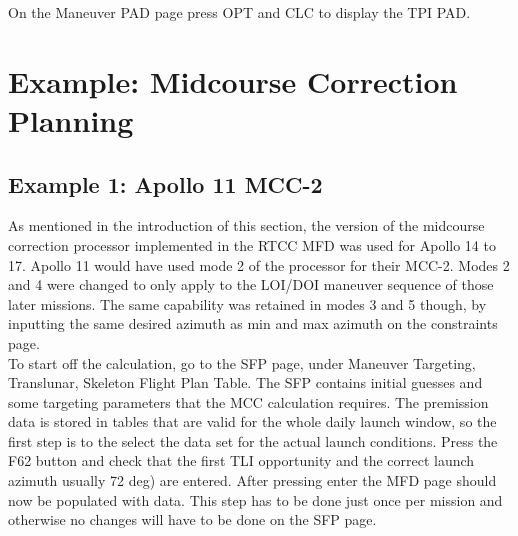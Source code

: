 \documentclass[11pt]{article} %
\begin{document}
On the Maneuver PAD page press OPT and CLC to display the TPI PAD.\\




\newpage
\section{Example: Midcourse Correction Planning}
\subsection{Example 1: Apollo 11 MCC-2}

As mentioned in the introduction of this section, the version of the midcourse correction processor implemented in the RTCC MFD was used for Apollo 14 to 17. Apollo 11 would have used mode 2 of the processor for their MCC-2. Modes 2 and 4 were changed to only apply to the LOI/DOI maneuver sequence of those later missions. The same capability was retained in modes 3 and 5 though, by inputting the same desired azimuth as min and max azimuth on the constraints page.\\

To start off the calculation, go to the SFP page, under Maneuver Targeting, Translunar, Skeleton Flight Plan Table. The SFP contains initial guesses and some targeting parameters that the MCC calculation requires. The premission data is stored in tables that are valid for the whole daily launch window, so the first step is to the select the data set for the actual launch conditions. Press the F62 button and check that the first TLI opportunity and the correct launch azimuth usually 72 deg) are entered. After pressing enter the MFD page should now be populated with data. This step has to be done just once per mission and otherwise no changes will have to be done on the SFP page.\\
\end{document}
